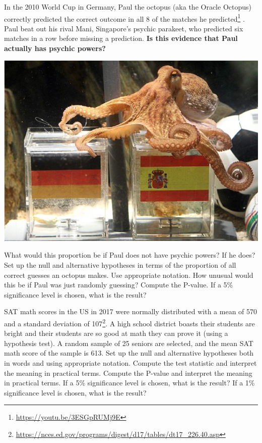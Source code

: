 \bb
\ii
\begin{multicols}{2}
In the 2010 World Cup in Germany, Paul the octopus (aka the Oracle Octopus) correctly predicted the correct outcome in all 8 of the matches he predicted\footnote{\href{https://youtu.be/3ESGpRUMj9E}{\underline{https://youtu.be/3ESGpRUMj9E}}} . Paul beat out his rival Mani, Singapore's psychic parakeet, who predicted six matches in a row before missing a prediction. \textbf{Is this evidence that Paul actually has psychic powers?}
\columnbreak

\includegraphics[width=0.4\tw]{20/fig-paul.png}

\end{multicols}

\bb
\ii What would this proportion be if Paul does not have psychic powers? If he does? Set up the null and alternative hypotheses in terms of the proportion of all correct guesses an octopus makes. Use appropriate notation. \vspace{1in}
\ii  How unusual would this be if Paul was just randomly guessing? Compute the P-value.   \vfill
\ii If a 5\% significance level is chosen, what is the result?   \vspace{1.5in}
\ee

\clearpage

\ii SAT math scores in the US in 2017 were normally distributed with a mean of 570 and a standard deviation of 107\footnote{\href{https://nces.ed.gov/programs/digest/d17/tables/dt17\_226.40.asp}{\underline{https://nces.ed.gov/programs/digest/d17/tables/dt17\_226.40.asp}}}. A high school district boasts their students are bright and their students are so good at math they can prove it (using a hypothesis test). A random sample of 25 seniors are selected, and the mean SAT math score of the sample is 613.
\bb
\ii Set up the null and alternative hypotheses both in words and using appropriate notation. \vspace{1in}
\ii  Compute the test statistic and interpret the meaning in practical terms. \vfill
\ii  Compute the P-value and interpret the meaning in practical terms. \vfill
\ii If a 5\% significance level is chosen, what is the result? If a 1\% significance level is chosen, what is the result?  \vspace{1.5in}
\ee


